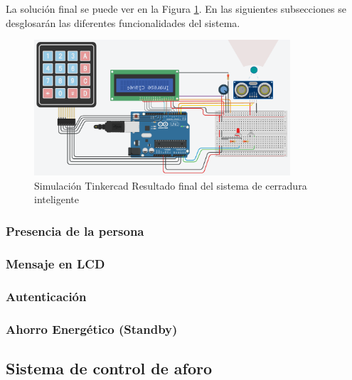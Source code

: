 \documentclass{article}
\begin{document}
La solución final se puede ver en la Figura \ref{fig:cerradura_smart}. En las siguientes subsecciones se desglosarán las diferentes funcionalidades del sistema.

\begin{figure}[H]
    \centering
    \includegraphics[width=0.85\textwidth]{./img/ckpt_6.png}
    \caption{Simulación Tinkercad Resultado final del sistema de cerradura inteligente}
    \label{fig:cerradura_smart}
\end{figure}

\subsubsection{Presencia de la persona}

\subsubsection{Mensaje en LCD}

\subsubsection{Autenticación}

\subsubsection{Ahorro Energético (Standby)}

\subsection{Sistema de control de aforo}
\end{document}
